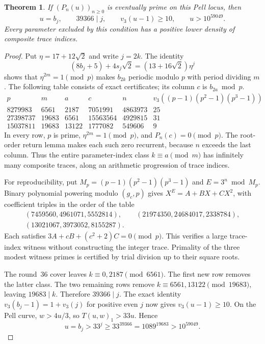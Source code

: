 \documentclass[11pt,a4paper]{article}
\newtheorem{theorem}{Theorem}[section]
\theoremstyle{remark}\newtheorem{remark}[theorem]{Remark}
\begin{document}
\begin{theorem}\label{thm:pell-new}
If $(P_n(u))_{n\ge0}$ is eventually prime on this Pell locus, then
\[
 u=b_j,\qquad39366\mid j,\qquad
 v_3(u-1)\ge10,\qquad u>10^{59049}.
\]
Every parameter excluded by this condition has a positive lower
density of composite trace indices.
\end{theorem}
\begin{proof}
Put $\eta=17+12\sqrt2$ and write $j=2k$. The identity
\[
 (8b_j+5)+4s_j\sqrt2=(13+16\sqrt2)\eta^j
\]
shows that $\eta^{2m}=1\pmod p$ makes $b_{2k}$ periodic modulo $p$
with period dividing $m$. The following table consists of exact
certificates; its column $c$ is $b_{2a}\bmod p$.
\[
\begin{array}{r|r|r|r|r|r}
p&m&a&c&n&v_3((p-1)(p^2-1)(p^3-1))\\\hline
8279983&6561&2187&7051991&4863973&25\\
27398737&19683&6561&15563564&4929815&31\\
15037811&19683&13122&1777082&549606&9
\end{array}
\]
In every row, $p$ is prime, $\eta^{2m}=1\pmod p$, and
$P_n(c)=0\pmod p$. The root-order return lemma makes each such
zero recurrent, because $n$ exceeds the last column. Thus the entire
parameter-index class $k\equiv a\pmod m$ has infinitely many
composite traces, along an arithmetic progression of trace indices.

For reproducibility, put $M_p=(p-1)(p^2-1)(p^3-1)$ and
$E=3^n\bmod M_p$. Binary polynomial powering modulo $(g_c,p)$ gives
$X^E=A+BX+CX^2$, with coefficient triples in the order of the table
\[
\begin{gathered}
(7459560,4961071,5552814),\qquad (21974350,24684017,2338784),\\
(13021067,3973052,8155287).\end{gathered}
\]
Each satisfies $3A+cB+(c^2+2)C=0\pmod p$. This verifies a large
trace-index witness without constructing the integer trace.
Primality of the three modest witness primes is certified by trial
division up to their square roots.

The round~36 cover leaves $k\equiv0,2187\pmod{6561}$.
The first new row removes the latter class. The two remaining rows
remove $k\equiv6561,13122\pmod{19683}$, leaving $19683\mid k$.
Therefore $39366\mid j$.
The exact identity $v_3(b_j-1)=1+v_3(j)$ for positive even $j$
now gives $v_3(u-1)\ge10$. On the Pell curve, $w>4u/3$, so
$T(u,w)_1>33u$. Hence
\[
 u=b_j>33^j\ge33^{39366}=1089^{19683}>10^{59049}.
\]
\end{proof}
\end{document}
